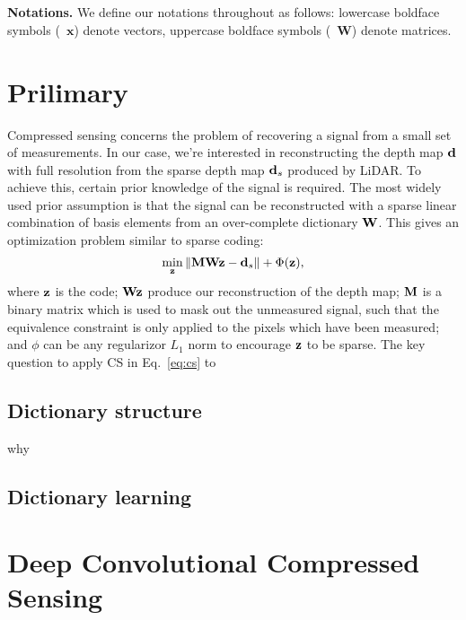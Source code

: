 \\
\\
\noindent\textbf{Notations.} We define our notations throughout as follows: lowercase boldface symbols (\eg~$\mathbf{x}$) denote vectors, uppercase boldface symbols (\eg~$\mathbf{W}$) denote matrices.
 
\section{Prilimary}
Compressed sensing concerns the problem of recovering a signal from a small set of measurements. In our case, we're interested in reconstructing the depth map $\mathbf{d}$ with full resolution from the sparse depth map $\mathbf{d}_s$ produced by LiDAR. To achieve this, certain prior knowledge of the signal is required. The most widely used prior assumption is that the signal can be reconstructed with a sparse linear combination of basis elements from an over-complete dictionary $\mathbf{W}$. This gives an optimization problem similar to sparse coding:
\begin{equation}
    \min_{\mathbf{z}} \Vert \mathbf{M}\mathbf{W}\mathbf{z} - \mathbf{d}_s \Vert + \Phi(\mathbf{z}),
    \label{eq:cs}
\end{equation}
where $\mathbf{z}$ is the code; $\mathbf{W}\mathbf{z}$ produce our reconstruction of the depth map; $\mathbf{M}$ is a binary matrix which is used to mask out the unmeasured signal, such that the equivalence constraint is only applied to the pixels which have been measured; and $\phi$ can be any regularizor \eg $L_1$ norm to encourage $\mathbf{z}$ to be sparse.
The key question to apply CS in Eq.~\ref{eq:cs} to 
\subsection{Dictionary structure}
why 

\subsection{Dictionary learning}

\section{Deep Convolutional Compressed Sensing}


 
